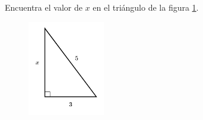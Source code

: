 \question[15]  Encuentra el valor de $x$ en el triángulo de la figura \ref{fig:lados_pitagoras_19}.
\begin{figure}[H]
    \begin{center}
        \includegraphics[width=0.3\textwidth]{../images/lados_pitagoras_19.png}
    \end{center}
    \caption{}
    \label{fig:lados_pitagoras_19}
\end{figure}